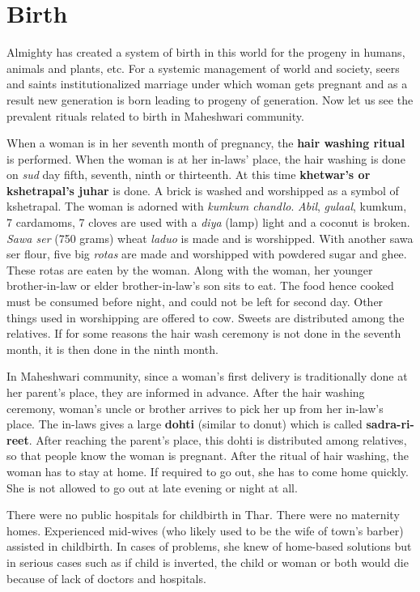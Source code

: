 \section{Birth}
Almighty has created a system of birth in this world for the progeny in humans,
animals and plants, etc. For a systemic management of world and society, seers
and saints institutionalized marriage under which woman gets pregnant and as a
result new generation is born leading to progeny of generation. Now let us see
the prevalent rituals related to birth in Maheshwari community.

When a woman is in her seventh month of pregnancy, the \textbf{hair
washing ritual} is performed.  When the woman is at her in-laws' place, the hair
washing is done on \textit{sud} day fifth, seventh, ninth or thirteenth.  At
this time \textbf{khetwar's or kshetrapal's juhar} is done. A brick is washed
and worshipped as a symbol of kshetrapal. The woman is adorned with
\textit{kumkum chandlo}. \textit{Abil}, \textit{gulaal}, kumkum, 7 cardamoms, 7
cloves are used with a \textit{diya} (lamp) light and a coconut is broken.
\textit{Sawa ser} (750 grams) wheat \textit{laduo} is made and is worshipped. With
another sawa ser flour, five big \textit{rotas} are made and worshipped with
powdered sugar and ghee. These rotas are eaten by the woman. Along with the
woman, her younger brother-in-law or elder brother-in-law's son sits to
eat. The food hence cooked must be consumed before night, and could not be left
for second day. Other things used in worshipping are offered to cow. Sweets are
distributed among the relatives. If for some reasons the hair wash ceremony is
not done in the seventh month, it is then done in the ninth month.

In Maheshwari community, since a woman's first delivery is traditionally done
at her parent's place, they are informed in advance. After the hair washing
ceremony, woman's uncle or brother arrives to pick her up from her in-law's
place.  The in-laws gives a large \textbf{dohti} (similar to donut) which is called
\textbf{sadra-ri-reet}. After reaching the parent's place, this dohti is
distributed among relatives, so that people know the woman is pregnant. After
the ritual of hair washing, the woman has to stay at home. If required to go
out, she has to come home quickly. She is not allowed to go out at late evening
or night at all.

There were no public hospitals for childbirth in Thar. There were no maternity
homes. Experienced mid-wives (who likely used to be the wife of town's barber)
assisted in childbirth. In cases of problems, she knew of home-based solutions
but in serious cases such as if child is inverted, the child or woman or both
would die because of lack of doctors and hospitals.

